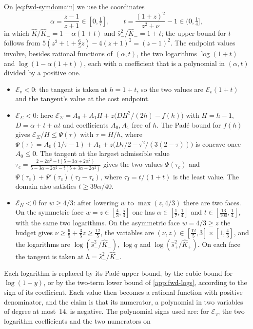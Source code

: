 On \eqref{eq:fwd-symdomain} we use the coordinates
\[
\alpha=\frac{z-1}{z+1}\in[0,\tfrac17],\qquad t=\frac{(1+z)^2}{z^2+\nu}-1\in(0,\tfrac14],
\]
in which $\hat K/\hat K_-=1-\alpha(1+t)$ and $\hat s_-^2/\hat K_-=1+t$; the upper bound for $t$
follows from $5(z^2+1+\frac65z)-4(z+1)^2=(z-1)^2$. The endpoint values involve, besides rational
functions of $(\alpha,t)$, the two logarithms $\log(1+t)$ and $\log(1-\alpha(1+t))$, each with a
coefficient that is a polynomial in $(\alpha,t)$ divided by a positive one.
\begin{itemize}
\item $\mathcal E_v<0$: the tangent is taken at $h=1+t$, so the two values are
  $\mathcal E_v(1+t)$ and the tangent's value at the cost endpoint.
\item $\mathcal E_\Sigma<0$: here $\mathcal E_\Sigma=A_0+A_1H+z\bigl(DH^2/(2h)-f(h)\bigr)$ with
  $H=h-1$, $D=\alpha+t+\alpha t$ and coefficients $A_0,A_1$ free of $h$. The Pad\'e bound for
  $f(h)$ gives $\mathcal E_\Sigma/H\le\Psi(\tau)$ with $\tau=H/h$, where
  $\Psi(\tau)=A_0(1/\tau-1)+A_1+z\bigl(D\tau/2-\tau^2/(3(2-\tau))\bigr)$ is concave once
  $A_0\le0$. The tangent at the largest admissible value
  $\tau_c=\frac{2-2\alpha^2-t(5+3\alpha+2\alpha^2)}{5-3\alpha-2\alpha^2-t(5+3\alpha+2\alpha^2)}$
  gives the two values $\Psi(\tau_c)$ and $\Psi(\tau_c)+\Psi'(\tau_c)(\tau_I-\tau_c)$, where
  $\tau_I=t/(1+t)$ is the least value. The domain also satisfies $t\ge39\alpha/40$.
\item $\mathcal E_N<0$ for $w\ge4/3$: after lowering $w$ to $\max(z,4/3)$ there are two faces. On
  the symmetric face $w=z\in[\frac43,\frac53]$ one has $\alpha\in[\frac17,\frac14]$ and
  $t\in[\frac{13}{100},\frac14]$, with the same two logarithms. On the asymmetric face $w=4/3\ge z$
  the budget gives $\nu\ge\frac95+\frac35z\ge\frac{12}5$, the variables are
  $(\nu,z)\in[\frac{12}5,3]\times[1,\frac43]$, and the logarithms are $\log(\hat s_-^2/\hat K_-)$,
  $\log q$ and $\log(\hat s_+^2/\hat K_+)$. On each face the tangent is taken at
  $h=\hat s_-^2/\hat K_-$.
\end{itemize}
Each logarithm is replaced by its Pad\'e upper bound, by the cubic bound for $\log(1-y)$, or by the
two-term lower bound of \cref{app:fwd-logs}, according to the sign of its coefficient. Each value
then becomes a rational function with positive denominator, and the claim is that its numerator,
a polynomial in two variables of degree at most~$14$, is negative. The polynomial signs used are:
for $\mathcal E_v$, the two logarithm coefficients and the two numerators on

